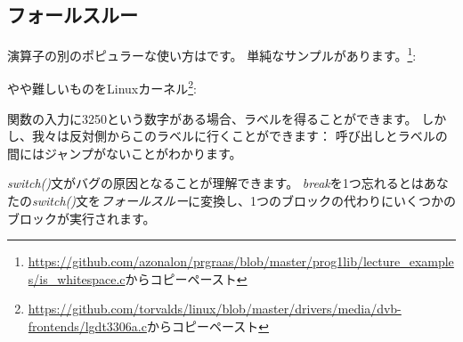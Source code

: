 ﻿\subsection{フォールスルー}

演算子の別のポピュラーな使い方はです。
単純なサンプルがあります。\footnote{\url{https://github.com/azonalon/prgraas/blob/master/prog1lib/lecture_examples/is_whitespace.c}からコピーペースト}:



やや難しいものをLinuxカーネル\footnote{\url{https://github.com/torvalds/linux/blob/master/drivers/media/dvb-frontends/lgdt3306a.c}からコピーペースト}:





関数の入力に3250という数字がある場合、ラベルを得ることができます。
しかし、我々は反対側からこのラベルに行くことができます：
\printf 呼び出しとラベルの間にはジャンプがないことがわかります。

\emph{switch()}文がバグの原因となることが理解できます。
\emph{break}を1つ忘れるとはあなたの\emph{switch()}文を\emph{フォールスルー}に変換し、1つのブロックの代わりにいくつかのブロックが実行されます。
